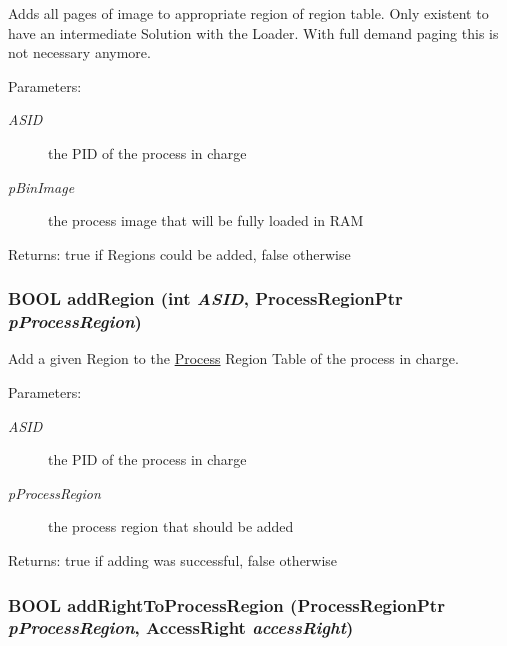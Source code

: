 Adds all pages of image to appropriate region of region table. Only existent to have an intermediate Solution with the Loader. With full demand paging this is not necessary anymore. \begin{Desc}
\item[Parameters:]
\begin{description}
\item[{\em ASID}]the PID of the process in charge \item[{\em pBinImage}]the process image that will be fully loaded in RAM \end{description}
\end{Desc}
\begin{Desc}
\item[Returns:]true if Regions could be added, false otherwise \end{Desc}
\hypertarget{group___v_m_m___p_r_t_g518e4adc2150f04b43eade644523eec7}{
\subsubsection[{addRegion}]{\setlength{\rightskip}{0pt plus 5cm}BOOL addRegion (int {\em ASID}, \/  {\bf ProcessRegionPtr} {\em pProcessRegion})}}
\label{group___v_m_m___p_r_t_g518e4adc2150f04b43eade644523eec7}


Add a given Region to the \hyperlink{struct_process}{Process} Region Table of the process in charge. \begin{Desc}
\item[Parameters:]
\begin{description}
\item[{\em ASID}]the PID of the process in charge \item[{\em pProcessRegion}]the process region that should be added \end{description}
\end{Desc}
\begin{Desc}
\item[Returns:]true if adding was successful, false otherwise \end{Desc}
\hypertarget{group___v_m_m___p_r_t_g729d2fee9d5aac1f889e6ecae833dd1b}{
\subsubsection[{addRightToProcessRegion}]{\setlength{\rightskip}{0pt plus 5cm}BOOL addRightToProcessRegion ({\bf ProcessRegionPtr} {\em pProcessRegion}, \/  AccessRight {\em accessRight})}}
\label{group___v_m_m___p_r_t_g729d2fee9d5aac1f889e6ecae833dd1b}


